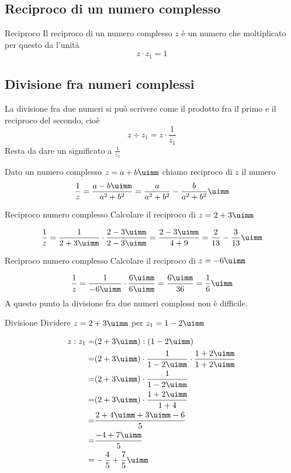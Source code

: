 \subsection{Reciproco di un numero complesso}
\begin{definizionet}{Reciproco}{}
Il reciproco di un numero complesso $z$ è un numero che moltiplicato per questo da l'unità
\[z\cdot z_1=1\]
\end{definizionet}
\subsection{Divisione fra numeri complessi}
La divisione fra due numeri si può scrivere come il prodotto fra il primo e il reciproco del secondo, cioè \[z\div z_1=z\cdot\dfrac{1}{z_1}\] Resta da dare un significato a $\frac{1}{z_1}$
\begin{definizionet}{}{}
	Dato un numero complesso $z=a+b\uimm $ chiamo reciproco di $z$ il numero \[\dfrac{1}{z}=\dfrac{a-b\uimm}{a^2+b^2}=\dfrac{a}{a^2+b^2}-\dfrac{b}{a^2+b^2}\uimm\]
\end{definizionet}
\begin{esempiot}{Reciproco numero complesso}{}
Calcolare il reciproco di $z=2+3\uimm$
\end{esempiot}
\[\dfrac{1}{z}=\dfrac{1}{2+3\uimm}\cdot\dfrac{2-3\uimm}{2-3\uimm}=\dfrac{2-3\uimm}{4+9}=\dfrac{2}{13}-\dfrac{3}{13}\uimm\]
\begin{esempiot}{Reciproco numero complesso}{}
	Calcolare il reciproco di $z=-6\uimm$
\end{esempiot}
	\[\dfrac{1}{z}=\dfrac{1}{-6\uimm}\cdot\dfrac{6\uimm}{6\uimm}=\dfrac{6\uimm}{36}=\dfrac{1}{6}\uimm\]
A questo punto la divisione fra due numeri complessi non è difficile.
\begin{esempiot}{Divisione}{}
Dividere $z=2+3\uimm$ per $z_1=1-2\uimm$
\end{esempiot}
\begin{align*}
z:z_1=&(2+3\uimm):(1-2\uimm)\\
=&(2+3\uimm)\cdot\dfrac{1}{1-2\uimm}\cdot\dfrac{1+2\uimm}{1+2\uimm}\\
=&(2+3\uimm)\cdot\dfrac{1}{1-2\uimm}\\
=&(2+3\uimm)\cdot\dfrac{1+2\uimm}{1+4}\\
=&\dfrac{2+4\uimm+3\uimm-6}{5}\\
=&\dfrac{-4+7\uimm}{5}\\
=&-\dfrac{4}{5}+\dfrac{7}{5}\uimm
\end{align*}
